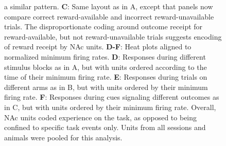 \documentclass[11pt]{article}
\newcommand{\bsf}[1]{\textbf{#1}}
\begin{document}
\begin{figure}[ht!]
{a similar pattern. \bsf{C}: Same layout as in A, except that panels now compare
correct reward-available and incorrect reward-unavailable trials. The disproportionate coding around outcome receipt for reward-available, but not reward-unavailable
trials suggests encoding of reward receipt by NAc units. \bsf{D-F}: Heat plots aligned to normalized minimum firing rates. \bsf{D}: Responses during different stimulus blocks as in A, but with units ordered according to
the time of their minimum firing rate. \bsf{E}: Responses during trials on different arms as in B, but with units ordered by their minimum
firing rate. \bsf{F}: Responses during cues signaling different outcomes as in C, but with units ordered by their minimum firing
rate. Overall, NAc units coded experience on the task, as opposed to being
confined to specific task events only. Units from all sessions and animals
were pooled for this analysis.}
\label{fig:NP_tiling}
\end{figure} \clearpage


\end{document}
